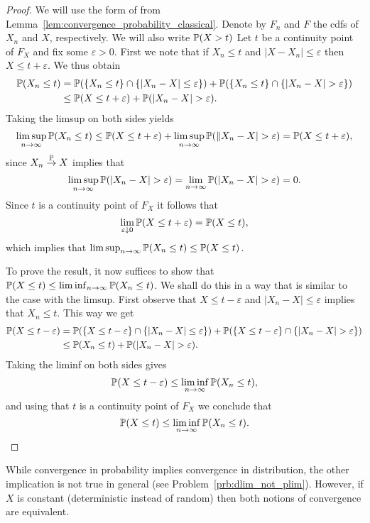 \begin{proof}
We will use the form of from Lemma~\ref{lem:convergence_probability_classical}. Denote by $F_n$ and $F$ the cdfs of $X_n$ and $X$, respectively. We will also write $\mathbb P(X > t)$ Let $t$ be a continuity point of $F_X$ and fix some $\varepsilon > 0$. First we note that if $X_n \le t$ and $|X-X_n|\le \varepsilon$ then $X \le t + \varepsilon$. We thus obtain
\begin{align*}
	\bbP(X_n \le t)
	&= \bbP(\{X_n \le t\} \cap \{|X_n - X| \le \varepsilon\}) + \bbP(\{X_n \le t\} \cap \{|X_n - X|>\varepsilon\})\\
	&\le \bbP(X \le t + \varepsilon) + \bbP(|X_n - X| > \varepsilon).
\end{align*}
Taking the limsup on both sides yields
\[
	\limsup_{n \to \infty} \mathbb P(X_n \le t)
	\le \mathbb P(X \le t + \varepsilon) + \limsup_{n \to \infty} \mathbb P(\|X_n - X| > \varepsilon)
	= \mathbb P(X \le t + \varepsilon),
\]
since $X_n \stackrel{\mathbb P}{\rightarrow} X$ implies that
\[
	\limsup_{n \to \infty} \mathbb P(|X_n - X| > \varepsilon)
	= \lim_{n \to \infty} \mathbb P(|X_n - X| > \varepsilon) = 0.
\]
Since $t$ is a continuity point of $F_X$ it follows that 
\[
	\lim_{\varepsilon \downarrow 0} \mathbb P(X \le t + \varepsilon) = \mathbb P(X \le t),
\]
which implies that $\limsup_{n \to \infty} \mathbb P(X_n \le t) \le \mathbb P(X \le t)$.

To prove the result, it now suffices to show that $\mathbb P(X \le t) \le \liminf_{n \to \infty} \mathbb P(X_n \le t)$.
We shall do this in a way that is similar to the case with the limsup. First observe that $X \le t - \varepsilon$ and $|X_n - X| \le \varepsilon$ implies that $X_n \le t$. This way we get
\begin{align*}
	\bbP(X \le t - \varepsilon)
	&= \bbP(\{X \le t - \varepsilon\} \cap \{|X_n -X|\le \varepsilon\}) + \bbP(\{X \le t - \varepsilon\} \cap \{|X_n - X|>\varepsilon\})\\
	&\le \bbP(X_n \le t) + \bbP(|X_n - X| > \varepsilon).
\end{align*}
Taking the liminf on both sides gives
\[
	\mathbb P(X \le t - \varepsilon)
	\le \liminf_{n \to \infty} \mathbb P(X_n \le t),
\]
and using that $t$ is a continuity point of $F_X$ we conclude that 
\[
	\mathbb P(X \le t) \le \liminf_{n \to \infty} \mathbb P(X_n \le t).\qedhere
\]
\end{proof}

While convergence in probability implies convergence in distribution, the other implication is not true in general (see Problem~\ref{prb:dlim_not_plim}). However, if $X$ is constant (deterministic instead of random) then both notions of convergence are equivalent.


